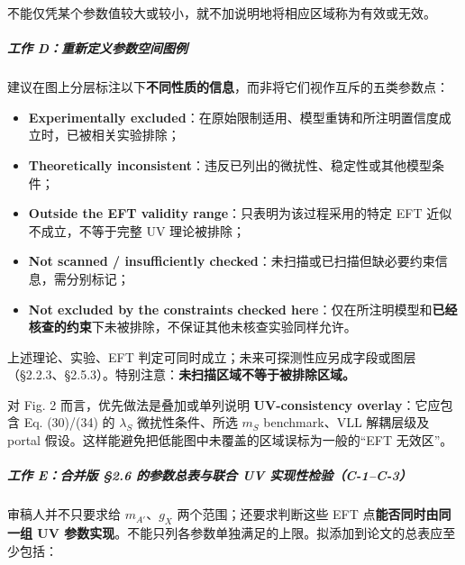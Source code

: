 \documentclass[
  chinese,
  UTF8]{ctexart}
\providecommand{\tightlist}{%
  \setlength{\itemsep}{0pt}\setlength{\parskip}{0pt}}
\begin{document}
不能仅凭某个参数值较大或较小，就不加说明地将相应区域称为有效或无效。

\subparagraph{工作
D：重新定义参数空间图例}\label{ux5de5ux4f5c-dux91cdux65b0ux5b9aux4e49ux53c2ux6570ux7a7aux95f4ux56feux4f8b}

建议在图上分层标注以下\textbf{不同性质的信息}，而非将它们视作互斥的五类参数点：

\begin{itemize}
\tightlist
\item
  \textbf{Experimentally
  excluded}：在原始限制适用、模型重铸和所注明置信度成立时，已被相关实验排除；
\item
  \textbf{Theoretically
  inconsistent}：违反已列出的微扰性、稳定性或其他模型条件；
\item
  \textbf{Outside the EFT validity range}：只表明为该过程采用的特定 EFT
  近似不成立，不等于完整 UV 理论被排除；
\item
  \textbf{Not scanned / insufficiently
  checked}：未扫描或已扫描但缺必要约束信息，需分别标记；
\item
  \textbf{Not excluded by the constraints checked
  here}：仅在所注明模型和\textbf{已经核查的约束}下未被排除，不保证其他未核查实验同样允许。
\end{itemize}

上述理论、实验、EFT
判定可同时成立；未来可探测性应另成字段或图层（§2.2.3、§2.5.3）。特别注意：\textbf{未扫描区域不等于被排除区域。}

对 Fig. 2 而言，优先做法是叠加或单列说明 \textbf{UV-consistency
overlay}：它应包含 Eq. (30)/(34) 的 \(\lambda_S\) 微扰性条件、所选
\(m_S\) benchmark、VLL 解耦层级及 portal
假设。这样能避免把低能图中未覆盖的区域误标为一般的``EFT 无效区''。

\subparagraph{工作 E：合并版 §2.6 的参数总表与联合 UV
实现性检验（C-1--C-3）}\label{ux5de5ux4f5c-eux5408ux5e76ux7248-2.6-ux7684ux53c2ux6570ux603bux8868ux4e0eux8054ux5408-uv-ux5b9eux73b0ux6027ux68c0ux9a8cc-1c-3}

审稿人并不只要求给 \(m_{A'}\)、\(g_X\) 两个范围；还要求判断这些 EFT
点\textbf{能否同时由同一组 UV
参数实现}。不能只列各参数单独满足的上限。拟添加到论文的总表应至少包括：
\end{document}
